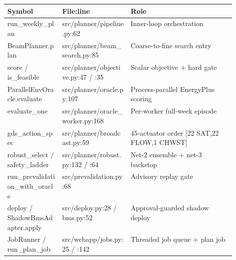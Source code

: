 \documentclass[10pt]{article}
\begin{document}
\vspace{1pt}\begin{tabularx}{\linewidth}{@{}>{\ttfamily\scriptsize}p{0.24\linewidth} p{0.30\linewidth} X@{}}
\toprule
\textbf{Symbol} & \textbf{File:line} & \textbf{Role} \\
\midrule
run\_\allowbreak{}weekly\_\allowbreak{}plan & src/\allowbreak{}planner/\allowbreak{}pipeline.py:62 & Inner-loop orchestration \\
BeamPlanner.plan & src/\allowbreak{}planner/\allowbreak{}beam\_\allowbreak{}search.py:85 & Coarse-to-fine search entry \\
score /\allowbreak{} is\_\allowbreak{}feasible & src/\allowbreak{}planner/\allowbreak{}objective.py:47 /\allowbreak{} :35 & Scalar objective + hard gate \\
ParallelEnvOracle.evaluate & src/\allowbreak{}planner/\allowbreak{}oracle.py:107 & Process-parallel EnergyPlus scoring \\
evaluate\_\allowbreak{}one & src/\allowbreak{}planner/\allowbreak{}oracle\_\allowbreak{}worker.py:168 & Per-worker full-week episode \\
gds\_\allowbreak{}action\_\allowbreak{}spec & src/\allowbreak{}planner/\allowbreak{}broadcast.py:59 & 45-actuator order [22 SAT,22 FLOW,1 CHWST] \\
robust\_\allowbreak{}select /\allowbreak{} safety\_\allowbreak{}ladder & src/\allowbreak{}planner/\allowbreak{}robust.py:132 /\allowbreak{} :64 & Net-2 ensemble + net-3 backstop \\
run\_\allowbreak{}prevalidation\_\allowbreak{}with\_\allowbreak{}oracle & src/\allowbreak{}prevalidation.py:68 & Advisory replay gate \\
deploy /\allowbreak{} ShadowBmsAdapter.apply & src/\allowbreak{}deploy.py:28 /\allowbreak{} bms.py:52 & Approval-guarded shadow deploy \\
JobRunner /\allowbreak{} run\_\allowbreak{}plan\_\allowbreak{}job & src/\allowbreak{}webapp/\allowbreak{}jobs.py:25 /\allowbreak{} :142 & Threaded job queue + plan job \\
\bottomrule
\end{tabularx}\vspace{2pt}
\end{document}
